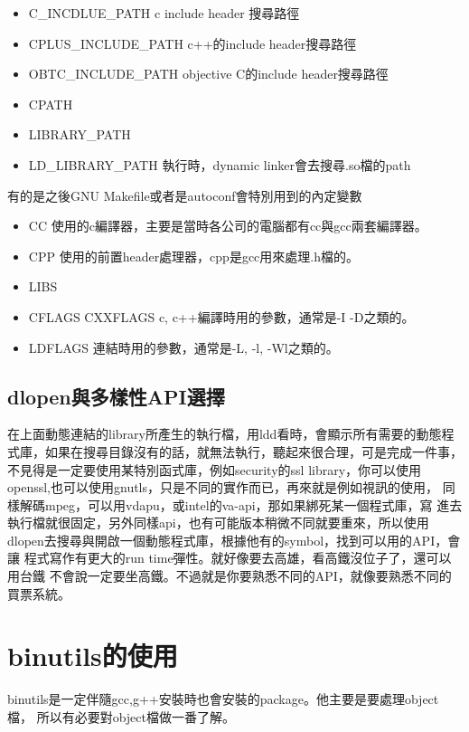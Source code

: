   \begin{itemize}
    \item C\_INCDLUE\_PATH c include header 搜尋路徑
    \item CPLUS\_INCLUDE\_PATH c++的include header搜尋路徑
    \item OBTC\_INCLUDE\_PATH objective C的include header搜尋路徑
    \item CPATH 
    \item LIBRARY\_PATH
    \item LD\_LIBRARY\_PATH 執行時，dynamic linker會去搜尋.so檔的path
  \end{itemize}
  有的是之後GNU Makefile或者是autoconf會特別用到的內定變數
  \begin{itemize}
    \item CC 使用的c編譯器，主要是當時各公司的電腦都有cc與gcc兩套編譯器。
    \item CPP 使用的前置header處理器，cpp是gcc用來處理.h檔的。
    \item LIBS 
    \item CFLAGS CXXFLAGS c, c++編譯時用的參數，通常是-I -D之類的。
    \item LDFLAGS 連結時用的參數，通常是-L, -l, -Wl之類的。
  \end{itemize}
    \subsection{dlopen與多樣性API選擇}
    在上面動態連結的library所產生的執行檔，用ldd看時，會顯示所有需要的動態程
    式庫，如果在搜尋目錄沒有的話，就無法執行，聽起來很合理，可是完成一件事，
    不見得是一定要使用某特別函式庫，例如security的ssl library，你可以使用
    openssl,也可以使用gnutls，只是不同的實作而已，再來就是例如視訊的使用，
    同樣解碼mpeg，可以用vdapu，或intel的va-api，那如果綁死某一個程式庫，寫
    進去執行檔就很固定，另外同樣api，也有可能版本稍微不同就要重來，所以使用
    dlopen去搜尋與開啟一個動態程式庫，根據他有的symbol，找到可以用的API，會讓
    程式寫作有更大的run time彈性。就好像要去高雄，看高鐵沒位子了，還可以用台鐵
    不會說一定要坐高鐵。不過就是你要熟悉不同的API，就像要熟悉不同的買票系統。

  \section{binutils的使用}
  binutils是一定伴隨gcc,g++安裝時也會安裝的package。他主要是要處理object檔，
  所以有必要對object檔做一番了解。
